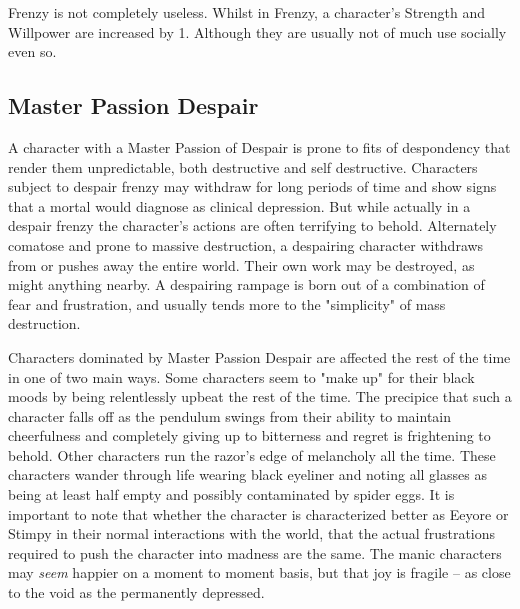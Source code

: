 Frenzy is not completely useless. Whilst in Frenzy, a character's Strength and Willpower are increased by 1. Although they are usually not of much use socially even so.

\subsection{Master Passion Despair}

A character with a Master Passion of Despair is prone to fits of despondency that render them unpredictable, both destructive and self destructive. Characters subject to despair frenzy may withdraw for long periods of time and show signs that a mortal would diagnose as clinical depression. But while actually in a despair frenzy the character's actions are often terrifying to behold. Alternately comatose and prone to massive destruction, a despairing character withdraws from or pushes away the entire world. Their own work may be destroyed, as might anything nearby. A despairing rampage is born out of a combination of fear and frustration, and usually tends more to the "simplicity" of mass destruction.  

Characters dominated by Master Passion Despair are affected the rest of the time in one of two main ways. Some characters seem to "make up" for their black moods by being relentlessly upbeat the rest of the time. The precipice that such a character falls off as the pendulum swings from their ability to maintain cheerfulness and completely giving up to bitterness and regret is frightening to behold. Other characters run the razor's edge of melancholy all the time. These characters wander through life wearing black eyeliner and noting all glasses as being at least half empty and possibly contaminated by spider eggs. It is important to note that whether the character is characterized better as Eeyore or Stimpy in their normal interactions with the world, that the actual frustrations required to push the character into madness are the same. The manic characters may \textit{seem} happier on a moment to moment basis, but that joy is fragile -- as close to the void as the permanently depressed. 

